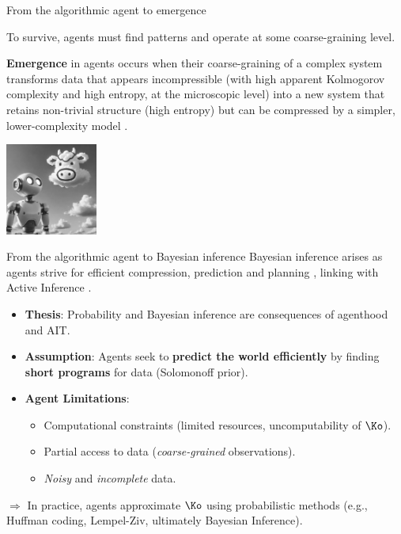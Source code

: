 \begin{frame}[label=emergence]{From the algorithmic agent to emergence}

To survive, agents must find patterns and operate at some coarse-graining level.

\begin{definition}[Emergence]
  \textbf{Emergence} in agents occurs when their coarse-graining of a complex system transforms data that appears incompressible (with high apparent Kolmogorov complexity and high entropy, at the microscopic level) into a new system that retains non-trivial structure (high entropy) but can be compressed by a simpler, lower-complexity model \cite{ruffiniNavigatingComplexityHow2024}.  
\end{definition}

\begin{center} 
  \includegraphics[height=3cm]{img/robot_emergence.png}
  \end{center}

\end{frame}





\begin{frame}{From the algorithmic agent to Bayesian inference}
Bayesian inference arises as agents strive for efficient compression, prediction and planning \cite{ruffiniNavigatingComplexityHow2024}, linking with Active Inference \cite{parr2022active}.
\begin{itemize}
    \item \textbf{Thesis}: Probability and Bayesian inference are consequences of agenthood and AIT.
    \item \textbf{Assumption}: Agents seek to \textbf{predict the world efficiently} by finding \textbf{short programs} for data (Solomonoff prior).
    \item \textbf{Agent Limitations}:
    \begin{itemize}
        \item Computational constraints (limited resources, uncomputability of $\Ko$).
        \item Partial access to data (\textit{coarse-grained} observations).
        \item \textit{Noisy} and \textit{incomplete} data.
    \end{itemize}
\end{itemize}
\vfill
    
    $\Rightarrow$  In practice, agents approximate $\Ko$ using probabilistic methods  (e.g., Huffman coding, Lempel-Ziv, ultimately Bayesian Inference).
\end{frame}


